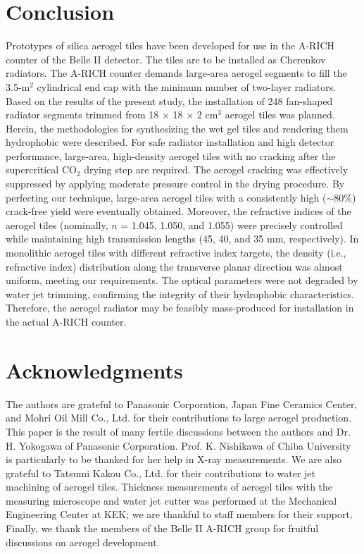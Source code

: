 \documentclass[5p,twocolumn]{elsarticle}
\begin{document}
\section{Conclusion}
\label{6}

Prototypes of silica aerogel tiles have been developed for use in the A-RICH counter of the Belle II detector. The tiles are to be installed as Cherenkov radiators. The A-RICH counter demands large-area aerogel segments to fill the 3.5-m$^2$ cylindrical end cap with the minimum number of two-layer radiators. Based on the results of the present study, the installation of 248 fan-shaped radiator segments trimmed from 18 $\times $ 18 $\times $ 2 cm$^3$ aerogel tiles was planned. Herein, the methodologies for synthesizing the wet gel tiles and rendering them hydrophobic were described. For safe radiator installation and high detector performance, large-area, high-density aerogel tiles with no cracking after the supercritical CO$_2$ drying step are required. The aerogel cracking was effectively suppressed by applying moderate pressure control in the drying procedure. By perfecting our technique, large-area aerogel tiles with a consistently high ($\sim $80\%) crack-free yield were eventually obtained. Moreover, the refractive indices of the aerogel tiles (nominally, $n$ = 1.045, 1.050, and 1.055) were precisely controlled while maintaining high transmission lengths (45, 40, and 35 mm, respectively). In monolithic aerogel tiles with different refractive index targets, the density (i.e., refractive index) distribution along the transverse planar direction was almost uniform, meeting our requirements. The optical parameters were not degraded by water jet trimming, confirming the integrity of their hydrophobic characteristics. Therefore, the aerogel radiator may be feasibly mass-produced for installation in the actual A-RICH counter.

\section*{Acknowledgments}
\label{}
The authors are grateful to Panasonic Corporation, Japan Fine Ceramics Center, and Mohri Oil Mill Co., Ltd. for their contributions to large aerogel production. This paper is the result of many fertile discussions between the authors and Dr. H. Yokogawa of Panasonic Corporation. Prof. K. Nishikawa of Chiba University is particularly to be thanked for her help in X-ray measurements. We are also grateful to Tatsumi Kakou Co., Ltd. for their contributions to water jet machining of aerogel tiles. Thickness measurements of aerogel tiles with the measuring microscope and water jet cutter was performed at the Mechanical Engineering Center at KEK; we are thankful to staff members for their support. Finally, we thank the members of the Belle II A-RICH group for fruitful discussions on aerogel development.
\end{document}
